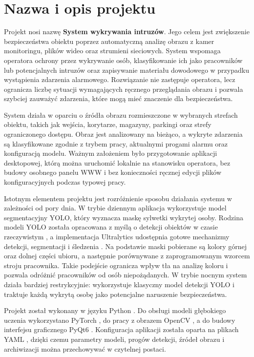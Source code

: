 \clearpage
\section{Nazwa i opis projektu}		%

Projekt nosi nazwę \textbf{System wykrywania intruzów}. Jego celem jest zwiększenie bezpieczeństwa obiektu poprzez automatyczną analizę obrazu z kamer monitoringu, plików wideo oraz strumieni sieciowych. System wspomaga operatora ochrony przez wykrywanie osób, klasyfikowanie ich jako pracowników lub potencjalnych intruzów oraz zapisywanie materiału dowodowego w przypadku wystąpienia zdarzenia alarmowego. Rozwiązanie nie zastępuje operatora, lecz ogranicza liczbę sytuacji wymagających ręcznego przeglądania obrazu i pozwala szybciej zauważyć zdarzenia, które mogą mieć znaczenie dla bezpieczeństwa.

System działa w oparciu o źródła obrazu rozmieszczone w wybranych strefach obiektu, takich jak wejścia, korytarze, magazyny, parkingi oraz strefy ograniczonego dostępu. Obraz jest analizowany na bieżąco, a wykryte zdarzenia są klasyfikowane zgodnie z trybem pracy, aktualnymi progami alarmu oraz konfiguracją modelu. Ważnym założeniem było przygotowanie aplikacji desktopowej, którą można uruchomić lokalnie na stanowisku operatora, bez budowy osobnego panelu WWW i bez konieczności ręcznej edycji plików konfiguracyjnych podczas typowej pracy.

Istotnym elementem projektu jest rozróżnienie sposobu działania systemu w zależności od pory dnia. W trybie dziennym aplikacja wykorzystuje model segmentacyjny YOLO, który wyznacza maskę sylwetki wykrytej osoby. Rodzina modeli YOLO została opracowana z myślą o detekcji obiektów w czasie rzeczywistym \cite{redmon2016yolo}, a implementacja Ultralytics udostępnia gotowe mechanizmy detekcji, segmentacji i śledzenia \cite{ultralyticsdocs}. Na podstawie maski pobierane są kolory górnej oraz dolnej części ubioru, a następnie porównywane z zaprogramowanym wzorcem stroju pracownika. Takie podejście ogranicza wpływ tła na analizę koloru i pozwala odróżnić pracowników od osób niepożądanych. W trybie nocnym system działa bardziej restrykcyjnie: wykorzystuje klasyczny model detekcji YOLO i traktuje każdą wykrytą osobę jako potencjalne naruszenie bezpieczeństwa.

Projekt został wykonany w języku Python \cite{pythondocs}. Do obsługi modeli głębokiego uczenia wykorzystano PyTorch \cite{paszke2019pytorch,pytorchdocs}, do pracy z obrazem OpenCV \cite{opencvdocs}, a do budowy interfejsu graficznego PyQt6 \cite{pyqtdocs}. Konfiguracja aplikacji została oparta na plikach YAML \cite{yamlspec}, dzięki czemu parametry modeli, progów detekcji, źródeł obrazu i archiwizacji można przechowywać w czytelnej postaci.

